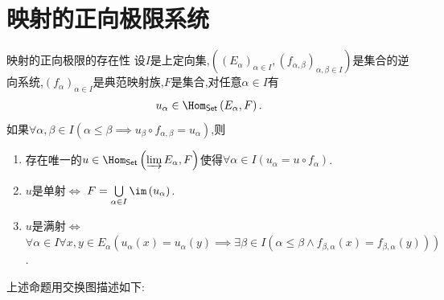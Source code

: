 \section{映射的正向极限系统}

\begin{proposition}{映射的正向极限的存在性}{}
	设$I$是上定向集,$\left(\left(E_{\alpha}\right)_{\alpha\in I},\left(f_{\alpha,\beta}\right)_{\alpha,\beta\in I}\right)$是集合的逆向系统,$\left(f_{\alpha}\right)_{\alpha\in I}$是典范映射族,$F$是集合,对任意$\alpha\in I$有
	\begin{align*}
		u_{\alpha}\in\Hom_{\mathsf{Set}}\left(E_{\alpha},F\right).
	\end{align*}
	如果$\forall\alpha,\beta\in I\left(\alpha\leq\beta\implies u_{\beta}\circ f_{\alpha,\beta}=u_{\alpha}\right)$,则
	\begin{enumerate}
		\item 存在唯一的$u\in\Hom_{\mathsf{Set}}\left(\varinjlim E_{\alpha},F\right)$使得$\forall\alpha\in I\left(u_{\alpha}=u\circ f_{\alpha}\right)$.
		\item $u$是单射$\iff$ $F=\bigcup\limits_{\alpha\in I}\im\left(u_{\alpha}\right)$.
		\item $u$是满射$\iff$ $\forall\alpha\in I\forall x,y\in E_{\alpha}\left(u_{\alpha}\left(x\right)=u_{\alpha}\left(y\right)\implies\exists\beta\in I\left(\alpha\leq\beta\wedge f_{\beta,\alpha}\left(x\right)=f_{\beta,\alpha}\left(y\right)\right)\right)$.
	\end{enumerate}
\end{proposition}

上述命题用交换图描述如下:
\begin{center}
\end{center}

